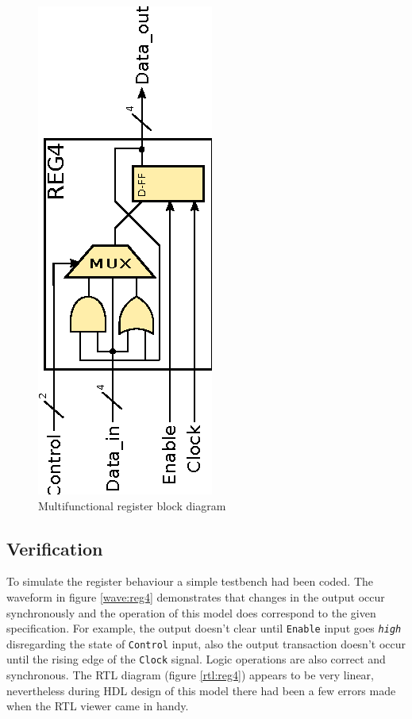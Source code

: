 \documentclass[10pt,a4paper]{report}
\begin{document}
\begin{figure}
\center
\includegraphics[scale=0.75,angle=-90]{graphs/reg_4bit.eps}
\caption{\small{Multifunctional register block diagram}} \label{block:reg4}
\end{figure}

\subsection{Verification}

 To simulate the register behaviour a simple testbench
 had been coded. The waveform in figure \ref{wave:reg4}
 demonstrates that changes in the output occur synchronously
 and the operation of this model does correspond to the given
 specification. 
 For example, the output doesn't clear until \texttt{Enable}
 input goes \emph{\texttt{high}} disregarding the state of
 \texttt{Control} input, also the output transaction doesn't
 occur until the rising edge of the \texttt{Clock} signal.
 Logic operations are also correct and synchronous.
 The RTL diagram (figure \ref{rtl:reg4}) appears to be
 very linear, nevertheless during HDL design of this model
 there had been a few errors made when the RTL viewer
 came in handy.
\end{document}
